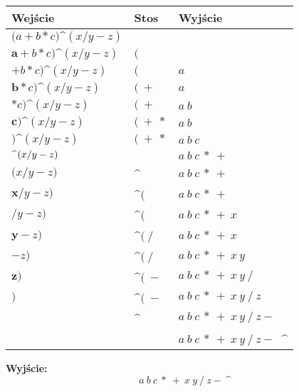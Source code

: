 \documentclass[main.tex]{subfiles}
\begin{document}
    \begin{table}[H]
        \begin{tabular}{|p{5cm}|p{5cm}|p{5cm}|}
            \hline
            \textbf{Wejście} & \textbf{Stos} & \textbf{Wyjście}\\
            \hline
            \hline
            $\boldsymbol{(}a+b*c)\text{\textasciicircum}(x/y - z)$ &&\\
            $\mathbf{a}+b*c)\text{\textasciicircum}(x/y - z)$ & $($ &\\
            $\boldsymbol{+}b*c)\text{\textasciicircum}(x/y - z)$ & $($ & $a$\\
            $\mathbf{b}*c)\text{\textasciicircum}(x/y - z)$ & $( ~ +$ & $a$\\
            $\boldsymbol{*}c)\text{\textasciicircum}(x/y - z)$  & $( ~ +$ & $a ~ b$\\
            $\mathbf{c})\text{\textasciicircum}(x/y - z)$  & $( ~ + ~ *$ & $a ~ b$\\
            $\boldsymbol{)}\text{\textasciicircum}(x/y - z)$  & $( ~ + ~ *$ & $a ~ b ~ c$\\
            $\text{\textbf{\textasciicircum}}(x/y - z)$  & & $a ~ b ~ c ~ * ~ +$\\
            $\boldsymbol{(}x/y - z)$  & \textasciicircum & $a ~ b ~ c ~ * ~ +$\\
            $\mathbf{x}/y - z)$  & \textasciicircum $($ & $a ~ b ~ c ~ * ~ +$\\
            $\boldsymbol{/}y - z)$  & \textasciicircum $($ & $a ~ b ~ c ~ * ~ + ~ x$\\
            $\mathbf{y} - z)$  & \textasciicircum $( ~ / $ & $a ~ b ~ c ~ * ~ + ~ x$\\
            $\boldsymbol{-} z)$  & \textasciicircum $( ~ / $ & $a ~ b ~ c ~ * ~ + ~ x ~ y$\\
            $\mathbf{z})$  & \textasciicircum $( ~ - $ & $a ~ b ~ c ~ * ~ + ~ x ~ y ~ /$\\
            $\boldsymbol{)}$  & \textasciicircum $( ~ - $ & $a ~ b ~ c ~ * ~ + ~ x ~ y ~ / ~ z$\\
            & \textasciicircum & $a ~ b ~ c ~ * ~ + ~ x ~ y ~ / ~ z -$\\
            & & $a ~ b ~ c ~ * ~ + ~ x ~ y ~ / ~ z - ~ $ \textasciicircum\\
            \hline
        \end{tabular}
    \end{table}
    \textbf{Wyjście:}
    \[a ~ b ~ c ~ * ~ + ~ x ~ y ~ / ~ z - ~ \text{\textasciicircum}\]
\end{document}
